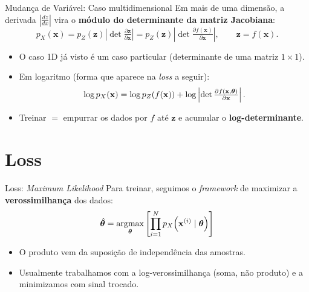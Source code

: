 \documentclass[aspectratio=169,xcolor=dvipsnames]{beamer}
\begin{document}
  \begin{frame}{Mudança de Variável: Caso multidimensional}
    Em mais de uma dimensão, a derivada $\left|\tfrac{dz}{dx}\right|$ vira o
    \textbf{módulo do determinante da matriz Jacobiana}:
    \vspace{0.3em}
    \[
      p_X(\mathbf{x}) = p_Z(\mathbf{z})\left|\det \tfrac{\partial \mathbf{z}}{\partial \mathbf{x}}\right|
      = p_Z(\mathbf{z})\left|\det \tfrac{\partial f(\mathbf{x})}{\partial \mathbf{x}}\right|,
      \qquad \mathbf{z} = f(\mathbf{x}).
    \]
    \vspace{0.2em}
    \begin{itemize}
      \item O caso 1D já visto é um caso particular (determinante de uma
      matriz $1{\times}1$).
      \item Em logaritmo (forma que aparece na \emph{loss} a seguir):
      \[
        \log p_X(\mathbf{x}) = \log p_Z(f(\mathbf{x}))
        + \log\left|\det \tfrac{\partial f(\mathbf{x},\bm{\theta})}{\partial \mathbf{x}}\right|.
      \]
      \item Treinar $=$ empurrar os dados por $f$ até $\mathbf{z}$ e
      acumular o \textbf{log-determinante}.
    \end{itemize}
  \end{frame}

  \section{Loss}

  \begin{frame}{Loss: \textit{Maximum Likelihood}}
    Para treinar, seguimos o \textit{framework} de maximizar a
    \textbf{verossimilhança} dos dados:
    \vspace{0.3em}
    \[
      \hat{\bm{\theta}} = \operatorname*{argmax}_{\bm{\theta}}
      \left[\prod_{i=1}^{N} p_X\!\left(\mathbf{x}^{(i)} \mid \bm{\theta}\right)\right]
    \]
    \vspace{0.2em}
    \begin{itemize}
      \item O produto vem da suposição de independência das amostras.
      \item Usualmente trabalhamos com a log-verossimilhança (soma, não
      produto) e a minimizamos com sinal trocado.
    \end{itemize}
  \end{frame}
\end{document}
